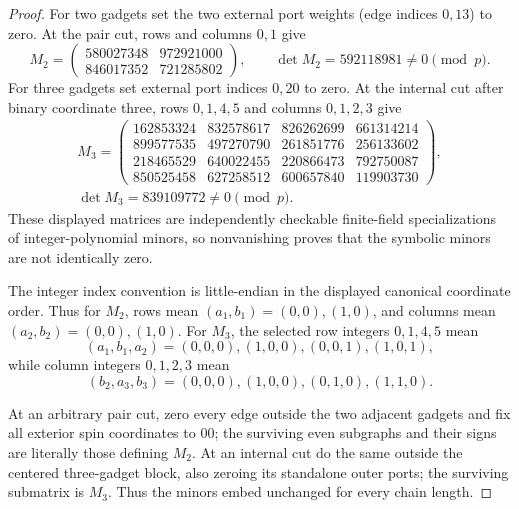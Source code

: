 \documentclass[11pt]{article}
\begin{document}
\begin{proof}
For two gadgets set the two external port weights (edge indices \(0,13\))
to zero.  At the pair cut, rows and columns \(0,1\) give
\[
 M_2=\begin{pmatrix}
580027348&972921000\\846017352&721285802
\end{pmatrix},\qquad
\det M_2=592118981\ne0\pmod p.
\]
For three gadgets set external port indices \(0,20\) to zero.  At the
internal cut after binary coordinate three, rows \(0,1,4,5\) and columns
\(0,1,2,3\) give
\[
\begin{gathered}
M_3=\begin{pmatrix}
162853324&832578617&826262699&661314214\\
899577535&497270790&261851776&256133602\\
218465529&640022455&220866473&792750087\\
850525458&627258512&600657840&119903730
\end{pmatrix},\\[-2pt]
\det M_3=839109772\ne0\pmod p.
\end{gathered}
\]
These displayed matrices are independently checkable finite-field
specializations of integer-polynomial minors, so nonvanishing proves that
the symbolic minors are not identically zero.

The integer index convention is little-endian in the displayed canonical
coordinate order.  Thus for \(M_2\), rows mean
\((a_1,b_1)=(0,0),(1,0)\), and columns mean
\((a_2,b_2)=(0,0),(1,0)\).  For \(M_3\), the selected row integers
\(0,1,4,5\) mean
\[
 (a_1,b_1,a_2)=(0,0,0),(1,0,0),(0,0,1),(1,0,1),
\]
while column integers \(0,1,2,3\) mean
\[
 (b_2,a_3,b_3)=(0,0,0),(1,0,0),(0,1,0),(1,1,0).
\]

At an arbitrary pair cut, zero every edge outside the two adjacent gadgets
and fix all exterior spin coordinates to \(00\); the surviving even
subgraphs and their signs are literally those defining \(M_2\).  At an
internal cut do the same outside the centered three-gadget block, also
zeroing its standalone outer ports; the surviving submatrix is \(M_3\).
Thus the minors embed unchanged for every chain length.


\end{proof}
\end{document}
